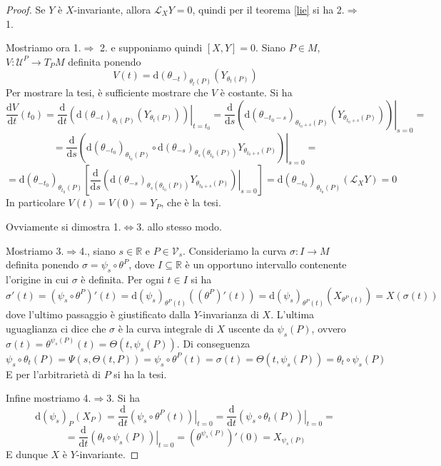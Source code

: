 \documentclass[a4paper,11pt]{article}
\theoremstyle{definition}
\theoremstyle{theorem}
\newcommand{\lie}[2]{\mathcal{L}_{#1}#2}
\newcommand{\dif}{\mathrm{d}}
\newcommand{\R}{\mathbb{R}}
\begin{document}
\begin{proof}
	Se $Y$ è $X$-invariante, allora $\lie{X}{Y}=0$, quindi per il teorema \ref{lie} si ha 2.$\Rightarrow$1. 
	
	Mostriamo ora 1.$\Rightarrow$ 2. e supponiamo quindi $[X,Y]=0$. Siano $P\in M$, $V\colon\mathcal{U}^P\to T_PM$ definita ponendo
	\[V(t)=\dif(\theta_{-t})_{\theta_t(P)}(Y_{\theta_t(P)})\]
	Per mostrare la tesi, è sufficiente mostrare che $V$ è costante. Si ha
	\[\frac{\dif V}{\dif t}(t_0)=\frac{\dif}{\dif t}\left.\left(\dif(\theta_{-t})_{\theta_t(P)}(Y_{\theta_t(P)})\right)\right|_{t=t_0}=\frac{\dif}{\dif s}\left.\left(\dif(\theta_{-t_0-s})_{\theta_{t_0+s}(P)}(Y_{\theta_{t_0+s}(P)})\right)\right|_{s=0}=\]
	\[=\frac{\dif}{\dif s}\left.\left(\dif(\theta_{-t_0})_{\theta_{t_0}(P)}\circ\dif(\theta_{-s})_{\theta_s(\theta_{t_0}(P))}Y_{\theta_{t_0+s}(P)}\right)\right|_{s=0}=\]
	\[=\dif(\theta_{-t_0})_{\theta_{t_0}(P)}\left[\frac{\dif}{\dif s}\left.\left(\dif(\theta_{-s})_{\theta_s(\theta_{t_0}(P))}Y_{\theta_{t_0+s}(P)}\right)\right|_{s=0}\right]=\dif(\theta_{-t_0})_{\theta_{t_0}(P)}\left(\lie{X}{Y}\right)=0\]
	In particolare $V(t)=V(0)=Y_P$, che è la tesi. 
	
	Ovviamente si dimostra 1.$\Leftrightarrow$3. allo stesso modo.
	
	Mostriamo 3.$\Rightarrow$4., siano $s\in\R$ e $P\in\mathcal{V}_s$. Consideriamo la curva $\sigma\colon I\to M$ definita ponendo $\sigma=\psi_s\circ\theta^P$, dove $I\subseteq\R$ è un opportuno intervallo contenente l'origine in cui $\sigma$ è definita. Per ogni $t\in I$ si ha
	\[\sigma'(t)=(\psi_s\circ\theta^P)'(t)=\dif(\psi_s)_{\theta^P(t)}\left((\theta^P)'(t)\right)=\dif(\psi_s)_{\theta^P(t)}\left(X_{\theta^P(t)}\right)=X\left(\sigma(t)\right)\]
	dove l'ultimo passaggio è giustificato dalla $Y$-invarianza di $X$. L'ultima uguaglianza ci dice che $\sigma$ è la curva integrale di $X$ uscente da $\psi_s(P)$, ovvero $\sigma(t)=\theta^{\psi_s(P)}(t)=\Theta(t,\psi_s(P))$. Di conseguenza
	\[\psi_s\circ\theta_t(P)=\Psi(s,\Theta(t,P))=\psi_s\circ\theta^P(t)=\sigma(t)=\Theta(t,\psi_s(P))=\theta_t\circ\psi_s(P)\]
	E per l'arbitrarietà di $P$ si ha la tesi.
	
	Infine mostriamo 4.$\Rightarrow$3. Si ha
	\[\dif(\psi_s)_P(X_P)=\frac{\dif}{\dif t}\left.\left(\psi_s\circ\theta^P(t)\right)\right|_{t=0}=\frac{\dif}{\dif t}\left.\left(\psi_s\circ\theta_t(P)\right)\right|_{t=0}=\]
	\[=\frac{\dif}{\dif t}\left.\left(\theta_t\circ\psi_s(P)\right)\right|_{t=0}=\left(\theta^{\psi_s(P)}\right)'(0)=X_{\psi_s(P)}\]
	E dunque $X$ è $Y$-invariante.
\end{proof}
\end{document}
